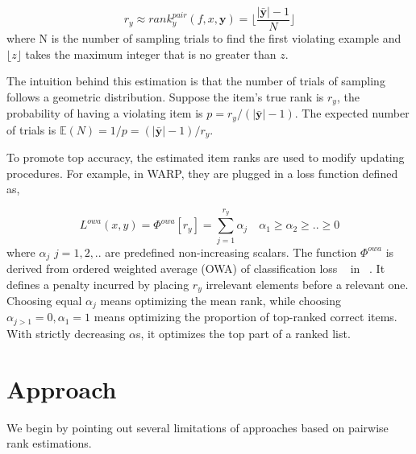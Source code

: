 \documentclass[letterpaper]{article}
\begin{document}
\begin{equation}
\label{eq:warp3}
r_y \approx rank^{pair}_y(f,x,\textbf{y}) = \lfloor \frac{|\bar{\textbf{y}}|-1}{N} \rfloor
\end{equation}
where N is the number of sampling trials to find the first violating example and $\lfloor z \rfloor$ takes the maximum integer that is no greater than $z$.

The intuition behind this estimation is that the number of trials of sampling follows a geometric distribution. Suppose the item's true rank is $r_y$, the probability of having a violating item is $p = r_y / (|\bar{\textbf{y}}| - 1)$. The expected number of trials is $\mathbb{E}(N) = 1/p=(|\bar{\textbf{y}}| - 1)/r_y$.

To promote top accuracy, the estimated item ranks are used to modify updating procedures. For example, in WARP, they are plugged in a loss function defined as, %

\begin{equation}
\label{eq:owc}
L^{owa}(x,y) = \Phi^{owa}[r_y] = \sum_{j=1}^{r_y} \alpha_j \quad \alpha_1\ge \alpha_2\ge..\ge 0
\end{equation}
where $\alpha_j$ $j=1,2,..$ are predefined non-increasing scalars. The function $\Phi^{owa}$ is derived from ordered weighted average (OWA) of classification loss ~\cite{yager1988ordered} in ~\cite{usunier2009ranking}. It defines a penalty incurred by placing $r_y$ irrelevant elements before a relevant one. Choosing equal $\alpha_j$ means optimizing the mean rank, while choosing $\alpha_{j>1}=0, \alpha_1=1$ means optimizing the proportion of top-ranked correct items. With strictly decreasing $\alpha$s, it optimizes the top part of a ranked list.

\section{Approach}
\label{sec:method}
We begin by pointing out several limitations of approaches based on pairwise rank estimations.
\end{document}
